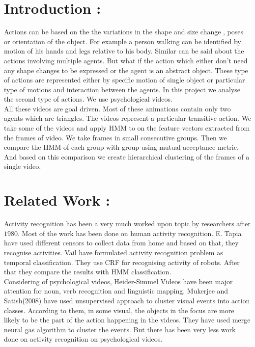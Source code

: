 \documentclass[11pt, twocolumn]{article}
\begin{document}
\section*{Introduction : }  Actions can be based on the the variations in the shape and size change , poses\cite{pami-Ben-ArieWPR02}  or orientation of the object. For example a person walking can be identified by motion of his hands and legs relative to his body. Similar can be said about the actions involving multiple agents. But what if the action which either don't need any shape changes to be expressed or the agent is an abstract object. These type of actions are represented either by specific motion of single object or particular type of motions and interaction between the agents. In this project we analyse the second type of actions. We use psychological videos\cite{fhanimation}. \\

All these videos are goal driven. Most of these animations contain only two agents which are triangles. The videos represent a particular transitive action. We take some of the videos and apply HMM to on the feature vectors extracted from the frames of video. We take frames in small consecutive groups. Then we compare the HMM of each group with  group using mutual acceptance metric. And based on this comparison we create hierarchical clustering of the frames of a single video.   


\section*{Related Work :}
Activity recognition has been a very much worked upon topic by researchers after $1980$. Most of the work has been done on human activity recognition. E. Tapia \cite{TapiaIL04} have used different censors to collect data from home and based on that, they recognise activities. Vail \cite{VailVL07} have formulated activity recognition problem as temporal classification. They use CRF for recognising activity of robots. After that they compare the results with HMM classification.\\
\hspace*{10pt} Considering of psychological videos, Heider-Simmel Videos \cite{heider} have been major attention for noun, verb recognition and linguistic mapping. Mukerjee and Satish(2008)\cite{satish-mukerjee-2008icdl} have used unsupervised approach to cluster visual events into action classes. According to them, in some visual, the objects in the focus are more likely to be the part of the action happening in the videos. They have used merge neural gas algorithm to cluster the events. But there has been very less work done on activity recognition on psychological videos. 
\end{document}
